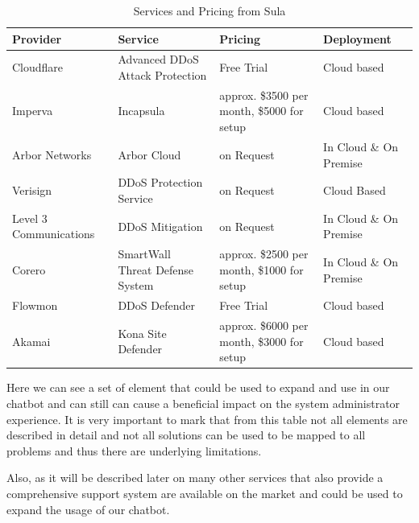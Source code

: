 \begin{table}[h]
\centering
\caption{Services and Pricing from Sula \cite{recomendationSystem}}
\begin{tabularx}{\textwidth}{|l|l|l|l|}
\hline
Provider               & Service                         & Pricing                                    & Deployment              \\ 
\hline
Cloudflare             & Advanced DDoS Attack Protection & Free Trial                                 & Cloud based             \\ 
\hline
Imperva                & Incapsula                       & approx. \$3500 per month, \$5000 for setup & Cloud based             \\ 
\hline
Arbor Networks         & Arbor Cloud                     & on Request                                 & In Cloud \& On Premise  \\ 
\hline
Verisign               & DDoS Protection Service         & on Request                                 & Cloud Based             \\ 
\hline
Level 3 Communications & DDoS Mitigation                 & on Request                                 & In Cloud \& On Premise  \\ 
\hline
Corero                 & SmartWall Threat Defense System & approx. \$2500 per month, \$1000 for setup & In Cloud \& On Premise  \\ 
\hline
Flowmon                & DDoS Defender                   & Free Trial                                 & Cloud based             \\ 
\hline
Akamai                 & Kona Site Defender              & approx. \$6000 per month, \$3000 for setup & Cloud based             \\
\hline
\end{tabularx}
\end{table}

Here we can see a set of element that could be used to expand and use in our chatbot and can still can cause a beneficial impact on the system administrator experience. It is very important to mark that from this table not all elements are described in detail and not all solutions can be used to be mapped to all problems and thus there are underlying limitations.

Also, as it will be described later on many other services that also provide a comprehensive support system are available on the market and could be used to expand the usage of our chatbot.